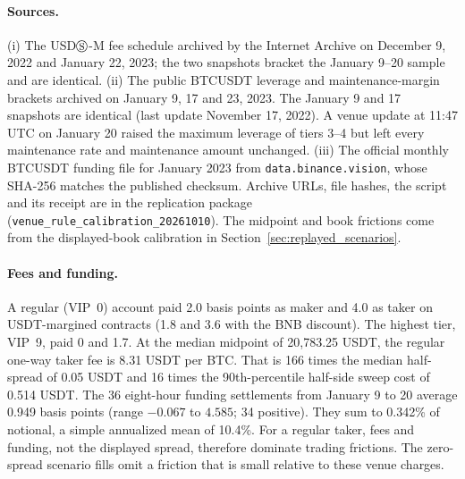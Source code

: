 \documentclass[12pt]{article}
\theoremstyle{definition}
\theoremstyle{remark}
\begin{document}
\paragraph{Sources.} (i) The USD$\circledS$-M fee schedule archived by the Internet Archive on December 9, 2022 and January 22, 2023; the two snapshots bracket the January 9--20 sample and are identical. (ii) The public BTCUSDT leverage and maintenance-margin brackets archived on January 9, 17 and 23, 2023. The January 9 and 17 snapshots are identical (last update November 17, 2022). A venue update at 11:47 UTC on January 20 raised the maximum leverage of tiers 3--4 but left every maintenance rate and maintenance amount unchanged. (iii) The official monthly BTCUSDT funding file for January 2023 from \texttt{data.binance.vision}, whose SHA-256 matches the published checksum. Archive URLs, file hashes, the script and its receipt are in the replication package (\texttt{venue\_rule\_calibration\_20261010}). The midpoint and book frictions come from the displayed-book calibration in Section~\ref{sec:replayed_scenarios}.

\paragraph{Fees and funding.} A regular (VIP~0) account paid 2.0 basis points as maker and 4.0 as taker on USDT-margined contracts (1.8 and 3.6 with the BNB discount). The highest tier, VIP~9, paid 0 and 1.7. At the median midpoint of 20,783.25 USDT, the regular one-way taker fee is 8.31 USDT per BTC. That is 166 times the median half-spread of 0.05 USDT and 16 times the 90th-percentile half-side sweep cost of 0.514 USDT. The 36 eight-hour funding settlements from January 9 to 20 average 0.949 basis points (range $-0.067$ to $4.585$; 34 positive). They sum to 0.342\% of notional, a simple annualized mean of 10.4\%. For a regular taker, fees and funding, not the displayed spread, therefore dominate trading frictions. The zero-spread scenario fills omit a friction that is small relative to these venue charges.
\end{document}
